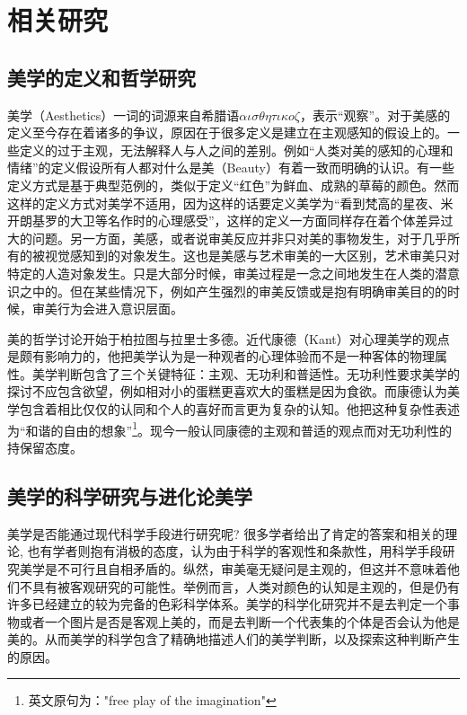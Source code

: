 \chapter{相关研究}
\label{chap:related}

\section{美学的定义和哲学研究}
美学（Aesthetics）一词的词源来自希腊语$\alpha\iota\sigma\theta\eta\tau\iota{\kappa}o\zeta$，表示“观察”。对于美感的定义至今存在着诸多的争议，原因在于很多定义是建立在主观感知的假设上的。一些定义的过于主观，无法解释人与人之间的差别。例如“人类对美的感知的心理和情绪”的定义假设所有人都对什么是美（Beauty）有着一致而明确的认识。有一些定义方式是基于典型范例的，类似于定义“红色”为鲜血、成熟的草莓的颜色。然而这样的定义方式对美学不适用，因为这样的话要定义美学为“看到梵高的星夜、米开朗基罗的大卫等名作时的心理感受”，这样的定义一方面同样存在着个体差异过大的问题。另一方面，美感，或者说审美反应并非只对美的事物发生，对于几乎所有的被视觉感知到的对象发生。这也是美感与艺术审美的一大区别，艺术审美只对特定的人造对象发生。只是大部分时候，审美过程是一念之间地发生在人类的潜意识之中的。但在某些情况下，例如产生强烈的审美反馈或是抱有明确审美目的的时候，审美行为会进入意识层面。

美的哲学讨论开始于柏拉图与拉里士多德。近代康德（Kant）对心理美学的观点是颇有影响力的，他把美学认为是一种观者的心理体验而不是一种客体的物理属性。美学判断包含了三个关键特征：主观、无功利和普适性。无功利性要求美学的探讨不应包含欲望，例如相对小的蛋糕更喜欢大的蛋糕是因为食欲。而康德认为美学包含着相比仅仅的认同和个人的喜好而言更为复杂的认知。他把这种复杂性表述为“和谐的自由的想象”\footnote{英文原句为："free play of the imagination"}。现今一般认同康德的主观和普适的观点而对无功利性的持保留态度。

\section{美学的科学研究与进化论美学}
美学是否能通过现代科学手段进行研究呢? 很多学者给出了肯定的答案和相关的理论, 也有学者则抱有消极的态度，认为由于科学的客观性和条款性，用科学手段研究美学是不可行且自相矛盾的。纵然，审美毫无疑问是主观的，但这并不意味着他们不具有被客观研究的可能性。举例而言，人类对颜色的认知是主观的，但是仍有许多已经建立的较为完备的色彩科学体系。美学的科学化研究并不是去判定一个事物或者一个图片是否是客观上美的，而是去判断一个代表集的个体是否会认为他是美的。从而美学的科学包含了精确地描述人们的美学判断，以及探索这种判断产生的原因。

